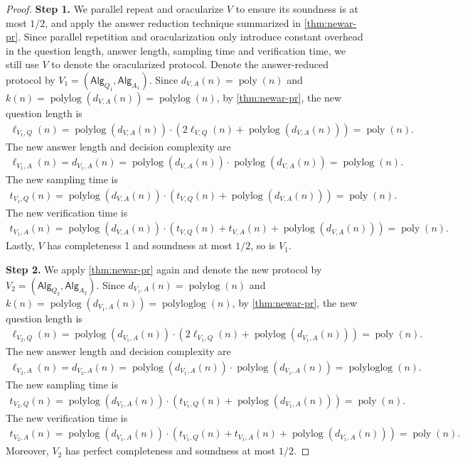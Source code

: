 \documentclass[11pt]{article}
\theoremstyle{plain}
\theoremstyle{definition}
\newcommand{\poly} {\ensuremath{\operatorname{poly}}}
\newcommand{\polylog} {\ensuremath{\operatorname{polylog}}}
\newcommand{\polyloglog} {\ensuremath{\operatorname{polyloglog}}}
\newcommand{\1}{\mathbb{1}} %
\newcommand{\Alg}{\mathsf{Alg}}
\begin{document}
\begin{proof}
    \textbf{Step 1.} We parallel repeat and oracularize $V$ to ensure its soundness is at most $1/2$, and apply the answer reduction technique summarized in \cref{thm:newar-pr}.
    Since parallel repetition and oracularization only introduce constant overhead in the question length, answer length, sampling time and verification time, we still use $V$ to denote the oracularized protocol.
    Denote the answer-reduced protocol by $V_1 = (\Alg_{Q_1},\Alg_{A_1})$.
    Since $d_{V,A}(n) = \poly(n)$ and $k(n)= \polylog(d_{V,A}(n)) = \polylog(n)$,
    by \cref{thm:newar-pr}, the new question length is
     \begin{align*}
         \ell_{V_1,Q}(n) = \polylog(d_{V,A}(n)) \cdot (2 \ell_{V,Q}(n) + \polylog(d_{V,A}(n))) = \poly(n).
     \end{align*}
     The new answer length and decision complexity are 
     \begin{align*}
         \ell_{V_1,A}(n) = d_{V_1, A}(n) = \polylog(d_{V,A}(n)) \cdot \polylog(d_{V,A}(n)) = \polylog(n).
     \end{align*}
     The new sampling time is
     \begin{align*}
         t_{V_1,Q}(n) = \polylog(d_{V,A}(n)) \cdot (t_{V,Q}(n) + \polylog(d_{V,A}(n))) = \poly(n).
     \end{align*}
     The new verification time is 
     \begin{align*}
         t_{V_1,A}(n) = \polylog(d_{V,A}(n)) \cdot (t_{V,Q}(n) + t_{V,A}(n) + \polylog(d_{V,A}(n))) = \poly(n).
     \end{align*}
     Lastly, $V$ has completeness 1 and soundness at most $1/2$, so is $V_1$.
    
    \textbf{Step 2.} We apply \cref{thm:newar-pr} again and denote the new protocol by $V_2 = (\Alg_{Q_2}, \Alg_{A_2})$.
    Since $d_{V_1,A}(n) = \polylog(n)$ and $k(n)= \polylog(d_{V_1,A}(n)) = \polyloglog(n)$,
    by \cref{thm:newar-pr}, the new question length is
     \begin{align*}
         \ell_{V_2,Q}(n) = \polylog(d_{V_1,A}(n)) \cdot (2 \ell_{V_1,Q}(n) + \polylog(d_{V_1,A}(n))) = \poly(n).
     \end{align*}
     The new answer length and decision complexity are 
     \begin{align*}
         \ell_{V_2,A}(n) = d_{V_2, A}(n) = \polylog(d_{V_1,A}(n)) \cdot \polylog(d_{V_1,A}(n)) = \polyloglog(n).
     \end{align*}
     The new sampling time is
     \begin{align*}
         t_{V_2,Q}(n) = \polylog(d_{V_1,A}(n)) \cdot (t_{V_1,Q}(n) + \polylog(d_{V_1,A}(n))) = \poly(n).
     \end{align*}
     The new verification time is 
     \begin{align*}
         t_{V_2,A}(n) = \polylog(d_{V_1,A}(n)) \cdot (t_{V_1,Q}(n) + t_{V_1,A}(n) + \polylog(d_{V_1,A}(n))) = \poly(n).
     \end{align*}
    Moreover, $V_2$ has perfect completeness and soundness at most $1/2$.
    

\end{proof}
\end{document}
